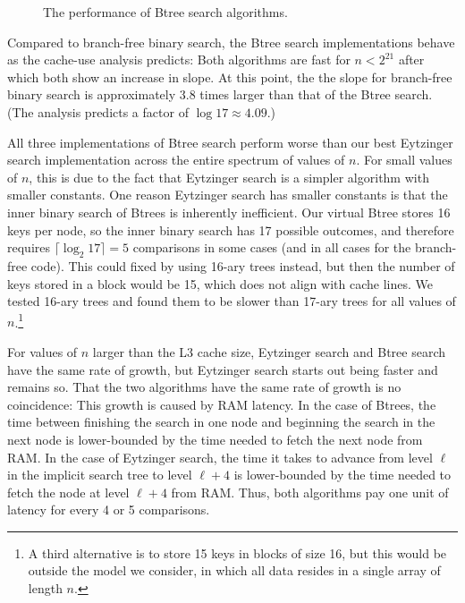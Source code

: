 \documentclass{patmorin}
\begin{document}
\begin{figure}
   \caption{The performance of Btree search algorithms.}
\end{figure}


Compared to branch-free binary search, the Btree search implementations
behave as the cache-use analysis predicts:  Both algorithms are fast for
$n<2^{21}$ after which both show an increase in slope. At this point,
the the slope for branch-free binary search is approximately 3.8 times
larger than that of the Btree search. (The analysis predicts a factor
of $\log 17\approx 4.09$.)

All three implementations of Btree search perform worse than our best
Eytzinger search implementation across the entire spectrum of values
of $n$.  For small values of $n$, this is due to the fact that Eytzinger
search is a simpler algorithm with smaller constants.  One reason
Eytzinger search has smaller constants is that the inner binary search
of Btrees is inherently inefficient. Our virtual Btree stores 16 keys per
node, so the inner binary search has 17 possible outcomes, and therefore
requires $\lceil\log_2 17\rceil=5$ comparisons in some cases (and in
all cases for the branch-free code).  This could fixed by using 16-ary
trees instead, but then the number of keys stored in a block would be 15,
which does not align with cache lines.  We tested 16-ary trees and found
them to be slower than 17-ary trees for all values of $n$.\footnote{A
third alternative is to store 15 keys in blocks of size 16, but this would
be outside the model we consider, in which all data resides in a single
array of length $n$.}

For values of $n$ larger than the L3 cache size, Eytzinger search and
Btree search have the same rate of growth, but Eytzinger search starts
out being faster and remains so.  That the two algorithms have the same
rate of growth is no coincidence: This growth is caused by RAM latency.
In the case of Btrees, the time between finishing the search in one
node and beginning the search in the next node is lower-bounded by the
time needed to fetch the next node from RAM.  In the case of Eytzinger
search, the time it takes to advance from level $\ell$ in the implicit
search tree to level $\ell+4$ is lower-bounded by the time needed to fetch
the node at level $\ell+4$ from RAM.  Thus, both algorithms pay one unit of
latency for every 4 or 5 comparisons.
\end{document}
